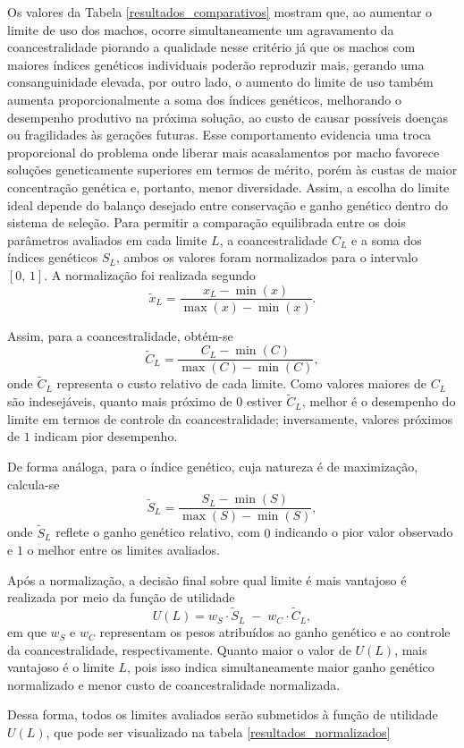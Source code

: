 Os valores da Tabela \ref{resultados_comparativos} mostram que, ao aumentar o limite de uso dos machos, ocorre simultaneamente um agravamento da coancestralidade piorando a qualidade nesse critério já que os machos com maiores índices genéticos individuais poderão reproduzir mais, gerando uma consanguinidade elevada, por outro lado, o aumento do limite de uso também aumenta proporcionalmente a soma dos índices genéticos, melhorando o desempenho produtivo na próxima solução, ao custo de causar possíveis doenças ou fragilidades às gerações futuras. Esse comportamento evidencia uma troca proporcional do problema onde liberar mais acasalamentos por macho favorece soluções geneticamente superiores em termos de mérito, porém às custas de maior concentração genética e, portanto, menor diversidade. Assim, a escolha do limite ideal depende do balanço desejado entre conservação e ganho genético dentro do sistema de seleção. 
Para permitir a comparação equilibrada entre os dois parâmetros avaliados em cada limite $L$, a coancestralidade $C_L$ e a soma dos índices genéticos $S_L$, ambos os valores foram normalizados para o intervalo $[0,\,1]$. A normalização foi realizada segundo
\[
\tilde{x}_L = \frac{x_L - \min(x)}{\max(x) - \min(x)}.
\]

Assim, para a coancestralidade, obtém-se
\[
\tilde{C}_L = \frac{C_L - \min(C)}{\max(C) - \min(C)},
\]
onde $\tilde{C}_L$ representa o custo relativo de cada limite. Como valores maiores de $C_L$ são indesejáveis, quanto mais próximo de $0$ estiver $\tilde{C}_L$, melhor é o desempenho do limite em termos de controle da coancestralidade; inversamente, valores próximos de $1$ indicam pior desempenho.

De forma análoga, para o índice genético, cuja natureza é de maximização, calcula-se
\[
\tilde{S}_L = \frac{S_L - \min(S)}{\max(S) - \min(S)},
\]
onde $\tilde{S}_L$ reflete o ganho genético relativo, com $0$ indicando o pior valor observado e $1$ o melhor entre os limites avaliados.

Após a normalização, a decisão final sobre qual limite é mais vantajoso é realizada por meio da função de utilidade
\[
U(L) = w_S \cdot \tilde{S}_L \;-\; w_C \cdot \tilde{C}_L,
\]
em que $w_S$ e $w_C$ representam os pesos atribuídos ao ganho genético e ao controle da coancestralidade, respectivamente. Quanto maior o valor de $U(L)$, mais vantajoso é o limite $L$, pois isso indica simultaneamente maior ganho genético normalizado e menor custo de coancestralidade normalizada.

Dessa forma, todos os limites avaliados serão submetidos à função de utilidade $U(L)$, que pode ser visualizado na tabela \ref{resultados_normalizados}

